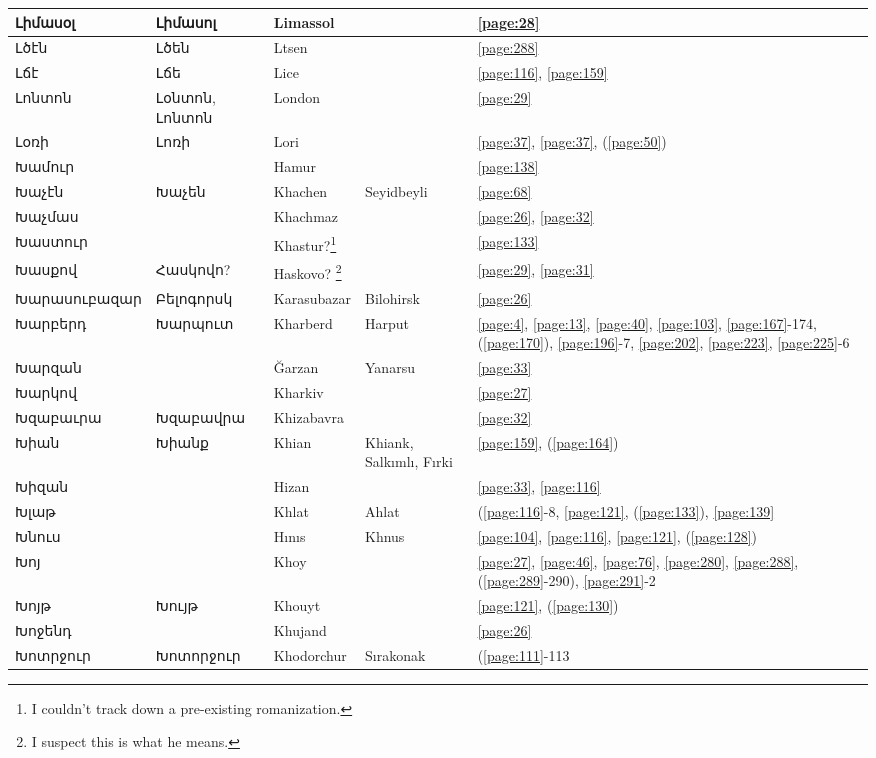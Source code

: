 \begin{center}
\begin{longtable}{|p{}|p{3cm}|p{3cm}|p{2cm}|p{3cm}|}
Լիմասօլ&Լիմասոլ &Limassol & &\ref{page:28}\\ \hline
Լծէն&Լծեն &Ltsen   & &\ref{page:288}\\ \hline
Լճէ&Լճե &Lice & &\ref{page:116}, \ref{page:159}\\ \hline
Լոնտոն&Լօնտոն, Լոնտոն &London & &\ref{page:29}\\ \hline
Լօռի&Լոռի & Lori& &\ref{page:37}, \ref{page:37}, (\ref{page:50})\\ \hline
Խամուր& &Hamur & &\ref{page:138}\\ \hline
Խաչէն&Խաչեն &Khachen & Seyidbeyli&\ref{page:68}\\ \hline
Խաչմաս& & Khachmaz& &\ref{page:26}, \ref{page:32}\\ \hline
Խաստուր& &Khastur?\footnote{I couldn't track down a pre-existing romanization.} & &\ref{page:133}\\ \hline
Խասքով&Հասկովո? &Haskovo? \footnote{I suspect this is what he means.} &  &\ref{page:29}, \ref{page:31}\\ \hline
Խարասուբազար&Բելոգորսկ & Karasubazar&Bilohirsk &\ref{page:26}\\ \hline
Խարբերդ& Խարպուտ
&Kharberd &Harput &\ref{page:4}, \ref{page:13}, \ref{page:40}, \ref{page:103}, \ref{page:167}-174, (\ref{page:170}), \ref{page:196}-7, \ref{page:202}, \ref{page:223}, \ref{page:225}-6\\ \hline
Խարզան& & Ğarzan&Yanarsu &\ref{page:33}\\ \hline
Խարկով& &Kharkiv & &\ref{page:27}\\ \hline
Խզաբաւրա&Խզաբավրա & Khizabavra& &\ref{page:32}\\ \hline
Խիան& Խիանք&Khian &Khiank, Salkımlı, Fırki &\ref{page:159}, (\ref{page:164})\\ \hline
Խիզան& &Hizan & &\ref{page:33}, \ref{page:116}\\ \hline
Խլաթ& & Khlat& Ahlat&(\ref{page:116}-8, \ref{page:121}, (\ref{page:133}), \ref{page:139}\\ \hline
Խնուս& & Hınıs   &Khnus &\ref{page:104}, \ref{page:116}, \ref{page:121}, (\ref{page:128})\\ \hline
Խոյ& &Khoy & &\ref{page:27}, \ref{page:46}, \ref{page:76}, \ref{page:280}, \ref{page:288}, (\ref{page:289}-290), \ref{page:291}-2\\ \hline
Խոյթ&Խույթ &Khouyt & &\ref{page:121}, (\ref{page:130})\\ \hline
Խոջենդ& &Khujand & &\ref{page:26}\\ \hline
Խոտրջուր& Խոտորջուր& Khodorchur&Sırakonak &(\ref{page:111}-113\\ \hline

\end{longtable}
\end{center}

